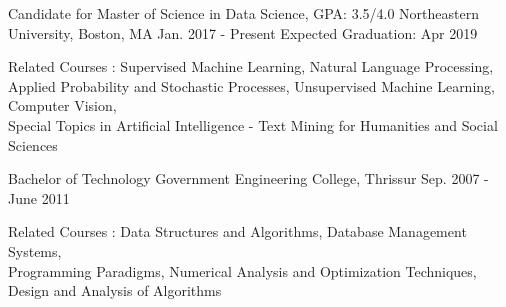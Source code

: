 \vspace{-0.1cm}
\begin{cventries}
  \cventry
    {Candidate for Master of Science in Data Science, GPA: 3.5/4.0}
    {Northeastern University, Boston, MA}
    {Jan. 2017 - Present}
    {Expected Graduation: Apr 2019 }
    {
      \begin{cvitems}
      \item {Related Courses : Supervised Machine Learning, Natural Language Processing, \\ Applied Probability and Stochastic Processes, Unsupervised Machine Learning, Computer Vision, \\Special Topics in Artificial Intelligence - Text Mining for Humanities and Social Sciences}
      \end{cvitems}
    }
      \cventry
    {Bachelor of Technology}
    {Government Engineering College, Thrissur}
    {Sep. 2007 - June 2011}
    {}
    {
      \begin{cvitems}
      \item {Related Courses : Data Structures and Algorithms, Database Management Systems, \\
          Programming Paradigms, Numerical Analysis and Optimization Techniques, Design and Analysis of Algorithms}
      \end{cvitems}
    }
\end{cventries}

